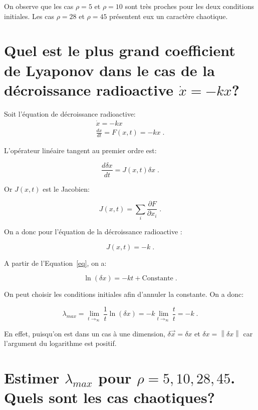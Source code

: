 \documentclass[a4paper, 12pt]{report}
\begin{document}
On observe que les cas $\rho=5$ et $\rho=10$ sont très proches pour les
deux conditions initiales. Les cas $\rho=28$ et $\rho=45$ présentent
eux un caractère chaotique.


\section{Quel est le plus grand coefficient de Lyaponov dans le cas de la
décroissance radioactive $\dot{x} = -kx$?}

Soit l'équation de décroissance radioactive:
\begin{align}
  \dot{x} =-kx\\
  \frac{dx}{dt} =F(x,t) =-kx\;.%
\end{align}

L'opérateur linéaire tangent au premier ordre est:

\begin{equation}\label{eq}
\frac{d \delta x}{d t} = J(x,t) \delta x\;.
\end{equation}

Or $J(x,t)$ est le Jacobien:

\begin{equation}
J(x,t)= \sum_{i}\frac{\partial F}{\partial x_{i}}\;.
\end{equation}


On a donc pour l'équation de la décroissance radioactive :

\begin{equation}
J(x,t)= -k\;.
\end{equation}

A partir de l'Equation~\eqref{eq}, on a:

\begin{equation}
 \ln(\delta x) = -kt + \text{Constante}\;.
\end{equation}

On peut choisir les conditions initiales afin d'annuler la constante. On a donc:

\begin{equation}
\lambda_{max}= \lim_{t\rightarrow_{\infty}}\frac{1}{t} \ln(\delta x)=-k \lim_{t\rightarrow_{\infty}}\frac{t}{t}= -k\;.
\end{equation}


En effet, puisqu'on est dans un cas à une dimension,
 $\delta \vec{x}= \delta x$ et  $\delta x = \left\|\delta x \right\|$ car
 l'argument du logarithme est positif.


\section{Estimer $\lambda_{max}$ pour $\rho=5,10,28,45$. Quels sont les cas
chaotiques?}

\end{document}
